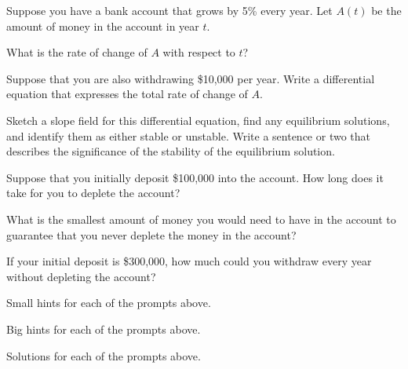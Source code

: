 \begin{activity} \label{A:7.4.finance}  
  Suppose you have a bank account that grows by 5\% every year.  Let $A(t)$ be the amount of money in the account in year $t$.

\ba
\item  What is the rate of change of $A$ with respect to $t$?

\item Suppose that you are also withdrawing \$10,000 per year.  Write
  a differential equation that expresses the total rate of change of
  $A$. 

\item Sketch a slope field for this differential equation, find any
  equilibrium solutions, and identify them as either stable or
  unstable.  Write a sentence or two that describes the significance
  of the stability of the equilibrium solution.

\item Suppose that you initially deposit \$100,000 into the account.  How
  long does it take for you to deplete the account?

\item What is the smallest amount of money you would need to have in
  the account to guarantee that you never deplete the money in the
  account? 
\item If your initial deposit is \$300,000, how much could you
  withdraw every year without depleting the account?

\ea
\end{activity}
\begin{smallhint}
\ba
	\item Small hints for each of the prompts above.
\ea
\end{smallhint}
\begin{bighint}
\ba
	\item Big hints for each of the prompts above.
\ea
\end{bighint}
\begin{activitySolution}
\ba
	\item Solutions for each of the prompts above.
\ea
\end{activitySolution}
\aftera